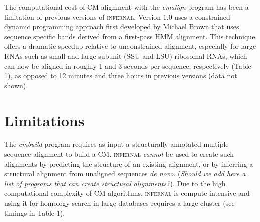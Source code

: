 \documentclass[11pt]{article}
\begin{document}

The computational cost of CM alignment with the \emph{cmalign} program
has been a limitation of previous versions of
\textsc{infernal}. Version 1.0 uses a constrained dynamic programming
approach first developed by Michael Brown \cite{Brown00} that uses
sequence specific bands derived from a first-pass HMM alignment. This
technique offers a dramatic speedup relative to unconstrained
alignment, especially for large RNAs such as small and large subunit
(SSU and LSU) ribosomal RNAs, which can now be aligned in roughly 1
and 3 seconds per sequence, respectively (Table 1), as opposed to 12
minutes and three hours in previous versions (data not shown).

\section{Limitations}
The \emph{cmbuild} program requires as input a structurally annotated
multiple sequence alignment to build a CM. \textsc{infernal}
\emph{cannot} be used to create such alignments by predicting the
structure of an existing alignment, or by inferring a structural
alignment from unaligned sequences \emph{de novo}. (\emph{Should we
add here a list of programs that can create structural
alignments?}). Due to the high computational complexity of CM
algorithms, \textsc{infernal} is compute intensive and using it for
homology search in large databases requires a large cluster (see
timings in Table 1).
\end{document}
